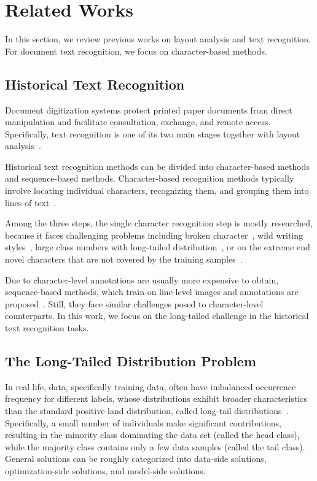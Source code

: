 \section{Related Works}
\label{sec:formatting}
In this section, we review previous works on layout analysis and text recognition. For document text recognition, we focus on character-based methods.


\subsection{Historical Text Recognition}
Document digitization systems protect printed paper documents from direct manipulation and facilitate consultation, exchange, and remote access. Specifically, text recognition is one of its two main stages together with layout analysis~\cite{jla}.

Historical text recognition methods can be divided into character-based methods and sequence-based methods. 
Character-based recognition methods typically involve locating individual characters, recognizing them, and grouping them into lines of text~\cite{papytwin}.

Among the three steps, the single character recognition step is mostly researched, because it faces challenging problems including broken character~\cite{broken}, wild writing styles~\cite{obc306}, large class numbers with long-tailed distribution~\cite{fewran}, or on the extreme end novel characters that are not covered by the training samples~\cite{hde,ligarature}.

Due to character-level annotations are usually more expensive to obtain,  sequence-based methods, which train on line-level images and annotations are proposed~\cite{eccvfork,jinic21}. Still, they face similar challenges posed to character-level counterparts. In this work, we focus on the long-tailed challenge in the historical text recognition tasks.

\subsection{The Long-Tailed Distribution Problem}


In real life, data, specifically training data, often have imbalanced occurrence frequency for different labels, whose distributions exhibit broader characteristics than the standard positive land distribution, called long-tail distributions~\cite{tailsurvey}. 
Specifically, a small number of individuals make significant contributions, resulting in the minority class dominating the data set (called the head class), while the majority class contains only a few data samples (called the tail class). 
General solutions can be roughly categorized into data-side solutions, optimization-side solutions, and model-side solutions.

